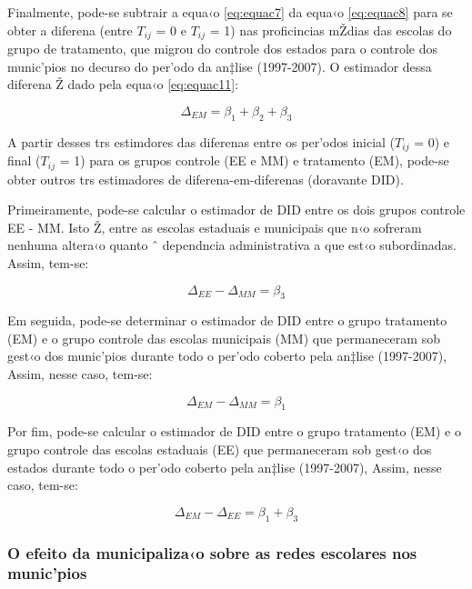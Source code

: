 \documentclass[a4paper, 12pt]{article}
\begin{document}
Finalmente, pode-se subtrair a equa‹o \ref{eq:equac7} da equa‹o \ref{eq:equac8} para se obter a diferena (entre $T_{ij}$ = 0 e $T_{ij}$ = 1) nas proficincias mŽdias das escolas do grupo de tratamento, que migrou do controle dos estados para o controle dos munic’pios no decurso do per’odo da an‡lise (1997-2007). O estimador dessa diferena Ž dado pela equa‹o \ref{eq:equac11}:

\begin{equation}
\Delta_{EM} =  \beta_1 + \beta_2 + \beta_3 \label{eq:equac11}
\end{equation}


A partir desses trs estimdores das diferenas entre os per’odos inicial ($T_{ij}$ = 0) e final ($T_{ij}$ = 1) para os grupos controle (EE e MM) e tratamento (EM), pode-se obter outros trs estimadores de diferena-em-diferenas (doravante DID). 

Primeiramente, pode-se calcular o estimador de DID entre os dois grupos controle EE - MM. Isto Ž, entre as escolas estaduais e municipais que n‹o sofreram nenhuma altera‹o quanto ˆ dependncia administrativa a que est‹o subordinadas. Assim, tem-se:

\begin{equation}
\Delta_{EE} - \Delta_{MM} =  \beta_3 \label{eq:equac12}
\end{equation}

Em seguida, pode-se determinar o estimador de DID entre o grupo tratamento (EM) e o grupo controle das escolas municipais (MM) que permaneceram sob gest‹o dos munic’pios durante todo o per’odo coberto pela an‡lise (1997-2007), Assim, nesse caso, tem-se:

\begin{equation}
\Delta_{EM} - \Delta_{MM} =  \beta_1 \label{eq:equac13}
\end{equation}


Por fim, pode-se calcular o estimador de DID entre o grupo tratamento (EM) e o grupo controle das escolas estaduais (EE) que permaneceram sob gest‹o dos estados durante todo o per’odo coberto pela an‡lise (1997-2007), Assim, nesse caso, tem-se:

\begin{equation}
\Delta_{EM} - \Delta_{EE} =  \beta_1 +  \beta_3 \label{eq:equac14}
\end{equation}


\subsubsection{O efeito da municipaliza‹o sobre as redes escolares nos munic’pios}
\end{document}
